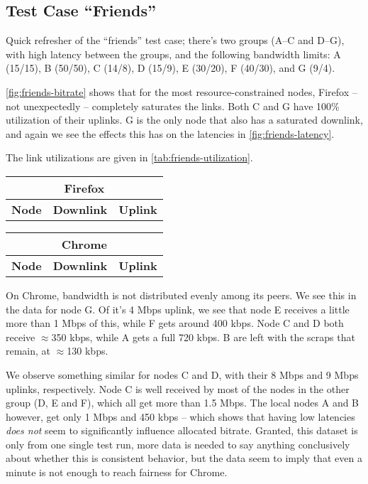 \subsection{Test Case ``Friends''}

Quick refresher of the ``friends'' test case; there's two groups (A--C and D--G), with high latency between the groups, and the following bandwidth limits: A (15/15), B (50/50), C (14/8), D (15/9), E (30/20), F (40/30), and G (9/4).

\autoref{fig:friends-bitrate} shows that for the most resource-constrained nodes, Firefox -- not unexpectedly -- completely saturates the links. Both C and G have 100\% utilization of their uplinks. G is the only node that also has a saturated downlink, and again we see the effects this has on the latencies in \autoref{fig:friends-latency}.

The link utilizations are given in \autoref{tab:friends-utilization}.

\begin{center}
    \label{tab:friends-utilization}
    \begin{tabular}{| l | l | l |}
    \multicolumn{3}{c}{\textbf{Firefox}} \\ \hline
    \textbf{Node} & \textbf{Downlink} & \textbf{Uplink} \\ \hline
    
    \hline
    \end{tabular}
    \begin{tabular}{| l | l | l |}
    \multicolumn{3}{c}{\textbf{Chrome}} \\ \hline
    \textbf{Node} & \textbf{Downlink} & \textbf{Uplink} \\ \hline
    
    \hline
    \end{tabular}
\end{center}

On Chrome, bandwidth is not distributed evenly among its peers. We see this in the data for node G. Of it's 4 Mbps uplink, we see that node E receives a little more than 1 Mbps of this, while F gets around 400 kbps. Node C and D both receive $\approx$350 kbps, while A gets a full 720 kbps. B are left with the scraps that remain, at $\approx$130 kbps.

We observe something similar for nodes C and D, with their 8 Mbps and 9 Mbps uplinks, respectively. Node C is well received by most of the nodes in the other group (D, E and F), which all get more than 1.5 Mbps. The local nodes A and B however, get only 1 Mbps and 450 kbps -- which shows that having low latencies \emph{does not} seem to significantly influence allocated bitrate. Granted, this dataset is only from one single test run, more data is needed to say anything conclusively about whether this is consistent behavior, but the data seem to imply that even a minute is not enough to reach fairness for Chrome.

